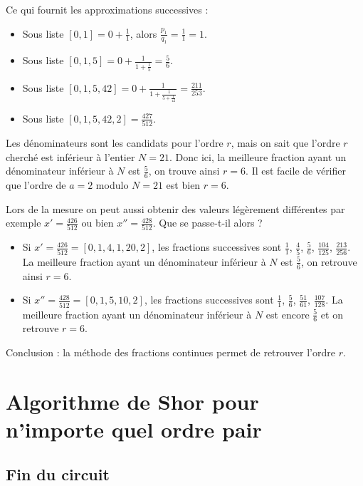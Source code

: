 \documentclass[11pt,class=report,crop=false]{standalone}
\begin{document}
Ce qui fournit les approximations successives :
\begin{itemize}
  \item Sous liste $[0,1] = 0+\frac11$, alors $\frac{p_1}{q_1} = \frac{1}{1} = 1$.
  \item Sous liste $[0,1,5] = 0+\frac{1}{1+\frac15}=\frac56$.
  \item Sous liste $[0,1,5,42] = 0+\frac{1}{1+\frac{1}{5+\frac1{42}}}=\frac{211}{253}$.
  \item Sous liste $[0,1,5,42,2] = \frac{427}{512}$.
\end{itemize}

Les dénominateurs sont les candidats pour l'ordre $r$, mais on sait que l'ordre $r$ cherché est inférieur à l'entier $N = 21$. Donc ici, la meilleure fraction ayant un dénominateur inférieur à $N$ est $\frac56$, on trouve ainsi $r=6$.
Il est facile de vérifier que l'ordre de $a=2$ modulo $N=21$ est bien $r=6$.


Lors de la mesure on peut aussi obtenir des valeurs légèrement différentes par exemple $x' = \frac{426}{512}$ ou bien $x'' = \frac{428}{512}$. Que se passe-t-il alors ? 
\begin{itemize}
  \item Si $x' = \frac{426}{512} = [0,1,4,1,20,2]$, les fractions successives sont $\frac11$, $\frac45$, $\frac56$, $\frac{104}{125}$, $\frac{213}{256}$. 
 La meilleure fraction ayant un dénominateur inférieur à $N$ est $\frac56$, on retrouve ainsi $r=6$.
  \item Si $x'' = \frac{428}{512} = [0,1,5,10,2]$, les fractions successives sont $\frac11$, $\frac56$, $\frac{51}{61}$, $\frac{107}{128}$. 
 La meilleure fraction ayant un dénominateur inférieur à $N$ est encore $\frac56$ et on retrouve $r=6$.
\end{itemize}

Conclusion : la méthode des fractions continues permet de retrouver l'ordre $r$.



\section{Algorithme de Shor pour n'importe quel ordre pair}


\subsection{Fin du circuit}
\end{document}
